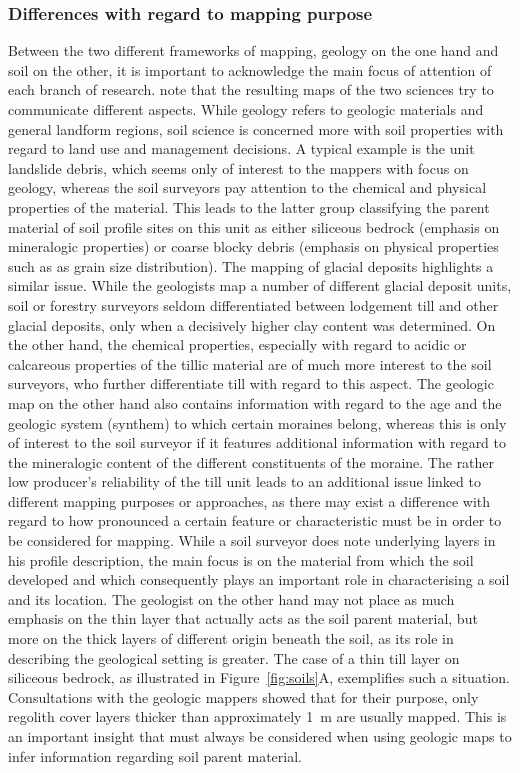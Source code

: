 \documentclass[preprint,12pt,authoryear]{elsarticle}
\begin{document}
\subsubsection{Differences with regard to mapping purpose}
Between the two different frameworks of mapping, geology on the one hand and soil on the other, it is important to acknowledge the main focus of attention of each branch of research. \cite{Miller2015a} note that the resulting maps of the two sciences try to communicate different aspects. While geology refers to geologic materials and general landform regions, soil science is concerned more with soil properties with regard to land use and management decisions. A typical example is the unit landslide debris, which seems only of interest to the mappers with focus on geology, whereas the soil surveyors pay attention to the chemical and physical properties of the material. This leads to the latter group classifying the parent material of soil profile sites on this unit as either siliceous bedrock (emphasis on mineralogic properties) or coarse blocky debris (emphasis on  physical properties such as as grain size distribution). The mapping of glacial deposits highlights a similar issue. While the geologists map a number of different glacial deposit units, soil or forestry surveyors seldom differentiated between lodgement till and other glacial deposits, only when a decisively higher clay content was determined. On the other hand, the chemical properties, especially with regard to acidic or calcareous properties of the tillic material are of much more interest to the soil surveyors, who further differentiate till with regard to this aspect. The geologic map on the other hand also contains information with regard to the age and the geologic system (synthem) to which certain moraines belong, whereas this is only of interest to the soil surveyor if it features additional information with regard to the mineralogic content of the different constituents of the moraine. The rather low producer's reliability  of the till unit leads to an additional issue linked to different mapping purposes or approaches, as there may exist a difference with regard to how pronounced a certain feature or characteristic must be in order to be considered for mapping. While a soil surveyor does note underlying layers in his profile description, the main focus is on the material from which the soil developed and which consequently plays an important role in characterising a soil and its location. The geologist on the other hand may not place as much emphasis on the thin layer that actually acts as the soil parent material, but more on the thick layers of different origin beneath the soil, as its role in describing the geological setting is greater. The case of a thin till layer on siliceous bedrock, as illustrated in Figure~\ref{fig:soils}A, exemplifies such a situation. Consultations with the geologic mappers showed that for their purpose, only regolith cover layers thicker than approximately 1~m are usually mapped. This is an important insight that must always be considered when using geologic maps to infer information regarding soil parent material.
\end{document}
